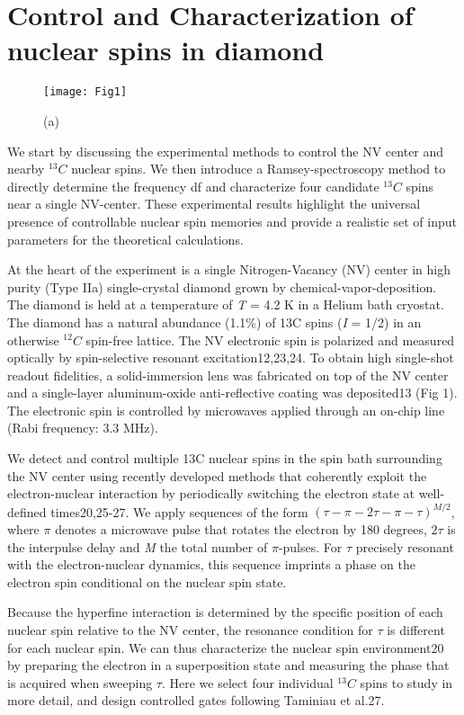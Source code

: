 \section{Control and Characterization of nuclear spins in diamond}
\begin{figure*}
	\centering
	\texttt{[image: Fig1]}
	\caption{\label{fig:cdl-fig1} \textbf{} (a) }
\end{figure*}

We start by discussing the experimental methods to control the NV center and nearby $^{13}C$  nuclear spins. We then introduce a Ramsey-spectroscopy method to directly determine the frequency df and characterize four candidate $^{13}C$  spins near a single NV-center. These experimental results highlight the universal presence of controllable nuclear spin memories and provide a realistic set of input parameters for the theoretical calculations.

At the heart of the experiment is a single Nitrogen-Vacancy (NV) center in high purity (Type IIa) single-crystal diamond grown by chemical-vapor-deposition. The diamond is held at a temperature of \textit{T} = 4.2 K in a Helium bath cryostat. The diamond has a natural abundance (1.1\%) of 13C spins (\textit{I} = 1/2) in an otherwise $^{12}C$ spin-free lattice. The NV electronic spin is polarized and measured optically by spin-selective resonant excitation12,23,24. To obtain high single-shot readout fidelities, a solid-immersion lens was fabricated on top of the NV center and a single-layer aluminum-oxide anti-reflective coating was deposited13 (Fig 1). The electronic spin is controlled by microwaves applied through an on-chip line (Rabi frequency: 3.3 MHz).     

We detect and control multiple 13C nuclear spins in the spin bath surrounding the NV center using recently developed methods that coherently exploit the electron-nuclear interaction by periodically switching the electron state at well-defined times20,25-27. We apply sequences of the form $(\tau - \pi - 2\tau - \pi - \tau)^{M/2}$, where $\pi$ denotes a microwave pulse that rotates the electron by 180 degrees, $2\tau$ is the interpulse delay and \textit{M} the total number of $\pi$-pulses. For $\tau$ precisely resonant with the electron-nuclear dynamics, this sequence imprints a phase on the electron spin conditional on the nuclear spin state. 

Because the hyperfine interaction is determined by the specific position of each nuclear spin relative to the NV center, the resonance condition for $\tau$ is different for each nuclear spin. We can thus characterize the nuclear spin environment20 by preparing the electron in a superposition state and measuring the phase that is acquired when sweeping $\tau$. Here we select four individual $^{13}C$ spins to study in more detail, and design controlled gates following Taminiau et al.27.

